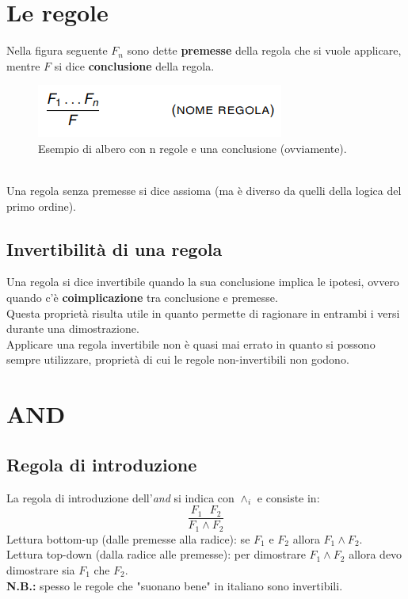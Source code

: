 \documentclass[12pt]{article}
\begin{document}
\section{Le regole}
\label{sec:rules}
Nella figura seguente $F_n$ sono dette \textbf{premesse} della regola che si vuole applicare, mentre $F$ si dice \textbf{conclusione} della regola.
\begin{figure}[!htb]
    \centering
    \includegraphics[width=.9\linewidth,height=.40\textheight,keepaspectratio]{brutta/regole_albero.png} %
    \begin{center}
        \caption{\label{fig:regole_albero}Esempio di albero con n regole e una conclusione (ovviamente).} %
    \end{center}
\end{figure}\\
Una regola senza premesse si dice assioma (ma è diverso da quelli della logica del primo ordine).

\subsection{Invertibilità di una regola}
\label{ssec:invertible_rule}
Una regola si dice invertibile quando la sua conclusione implica le ipotesi, ovvero quando c'è \textbf{coimplicazione} tra conclusione e premesse.\\
Questa proprietà risulta utile in quanto permette di ragionare in entrambi i versi durante una dimostrazione.\\
Applicare una regola invertibile non è quasi mai errato in quanto si possono sempre utilizzare, proprietà di cui le regole non-invertibili non godono.

\section{AND}
\label{sec:and}

\subsection{Regola di introduzione}
\label{ssec:and_intro}
La regola di introduzione dell'\textit{and} si indica con $\wedge_i$ e consiste in:
\begin{equation}
    \dfrac{F_1 \text{ } F_2}{F_1 \wedge F_2} \label{rule:and_intro}
\end{equation}
Lettura bottom-up (dalle premesse alla radice): se $F_1$ e $F_2$ allora $F_1 \wedge F_2$.\\
Lettura top-down (dalla radice alle premesse): per dimostrare $F_1 \wedge F_2$ allora devo dimostrare sia $F_1$ che $F_2$.\\
\textbf{N.B.:} spesso le regole che "suonano bene" in italiano sono invertibili.
\end{document}
